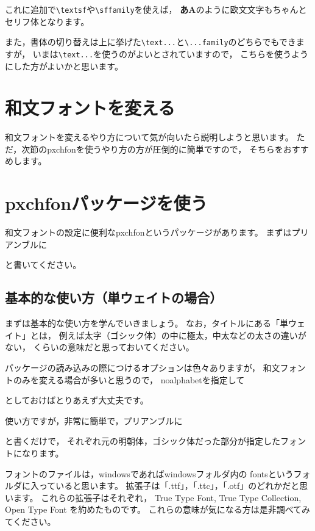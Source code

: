 これに追加で\verb|\textsf|や\verb|\sffamily|を使えば，
\textsf{\textbf{あA}}のように欧文文字もちゃんとセリフ体となります。

また，書体の切り替えは上に挙げた\verb|\text...|と\verb|\...family|のどちらでもできますが，
いまは\verb|\text...|を使うのがよいとされていますので，
こちらを使うようにした方がよいかと思います。



\section{和文フォントを変える}
和文フォントを変えるやり方について気が向いたら説明しようと思います。
ただ，次節のpxchfonを使うやり方の方が圧倒的に簡単ですので，
そちらをおすすめします。



\section{pxchfonパッケージを使う}
和文フォントの設定に便利なpxchfonというパッケージがあります。
まずはプリアンブルに
\begin{ITeX}
\usepackage{pxchfon}
\end{ITeX}
と書いてください。


\subsection{基本的な使い方（単ウェイトの場合）}
まずは基本的な使い方を学んでいきましょう。
なお，タイトルにある「単ウェイト」とは，
例えば太字（ゴシック体）の中に極太，中太などの太さの違いがない，
くらいの意味だと思っておいてください。

パッケージの読み込みの際につけるオプションは色々ありますが，
和文フォントのみを変える場合が多いと思うので，
noalphabetを指定して
\begin{ITeX}
\usepackage[noalphabet]{pxchfon}
\end{ITeX}
としておけばとりあえず大丈夫です。

使い方ですが，非常に簡単で，プリアンブルに
\begin{ITeX}
\end{ITeX}
と書くだけで，
それぞれ元の明朝体，ゴシック体だった部分が指定したフォントになります。

フォントのファイルは，windowsであればwindowsフォルダ内の
fontsというフォルダに入っていると思います。
拡張子は「.ttf」，「.ttc」，「.otf」のどれかだと思います。
これらの拡張子はそれぞれ，
True Type Font, True Type Collection, Open Type Font
を約めたものです。
これらの意味が気になる方は是非調べてみてください。

